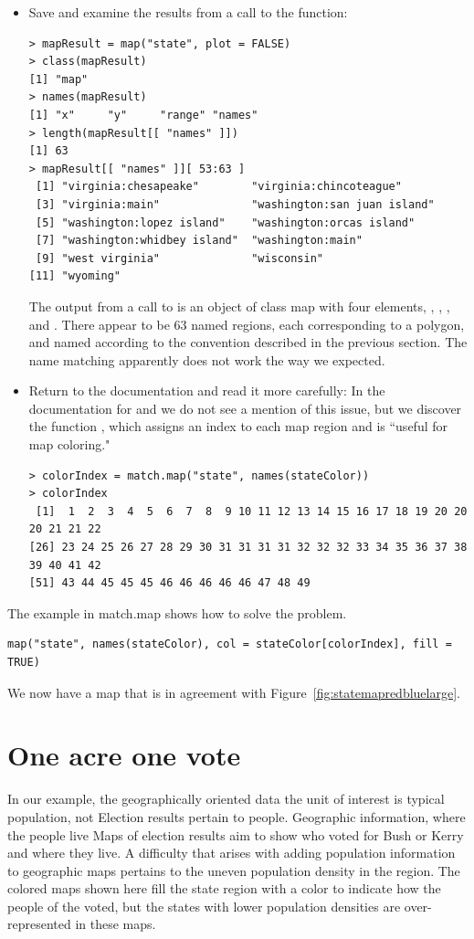 \begin{itemize}
\item Save and examine the results from a call to the function:
\small{
\begin{verbatim}
> mapResult = map("state", plot = FALSE)
> class(mapResult)
[1] "map"
> names(mapResult)
[1] "x"     "y"     "range" "names"
> length(mapResult[[ "names" ]])
[1] 63
> mapResult[[ "names" ]][ 53:63 ]
 [1] "virginia:chesapeake"        "virginia:chincoteague"     
 [3] "virginia:main"              "washington:san juan island"
 [5] "washington:lopez island"    "washington:orcas island"   
 [7] "washington:whidbey island"  "washington:main"           
 [9] "west virginia"              "wisconsin"                 
[11] "wyoming"                   
\end{verbatim}
}
The output from a call to  is an object of 
class map with four elements, , ,
, and .
There appear to be 63 named regions, each corresponding to a polygon,
and named according to the convention described in the previous section.
The name matching apparently does not work the way we expected.

\item Return to the documentation and read it more carefully: 
In the documentation for  and 
we do not see a mention of this issue, but we discover the 
function , which assigns an index to 
each map region and is ``useful for map coloring."

\small{
\begin{verbatim}
> colorIndex = match.map("state", names(stateColor))
> colorIndex
 [1]  1  2  3  4  5  6  7  8  9 10 11 12 13 14 15 16 17 18 19 20 20 20 21 21 22
[26] 23 24 25 26 27 28 29 30 31 31 31 31 32 32 32 33 34 35 36 37 38 39 40 41 42
[51] 43 44 45 45 45 46 46 46 46 46 47 48 49
\end{verbatim}
}
\end{itemize}

The example in match.map shows how to solve the problem.
\begin{verbatim}
map("state", names(stateColor), col = stateColor[colorIndex], fill = TRUE)
\end{verbatim}
We now have a map that is in agreement with Figure~\ref{fig:statemapredbluelarge}.


\section{One acre one vote}
In our example, the geographically oriented data the unit of interest is
typical population, not 
Election results pertain to people. 
Geographic information, where the people live 
Maps of election results aim to show who voted for Bush or Kerry and where they live. 
A difficulty that arises with adding population information to geographic maps pertains
to the uneven population density in the region. 
The colored maps shown here fill the state region with a color to indicate 
how the people of the voted, 
but the states with lower population densities are over-represented in these maps.

